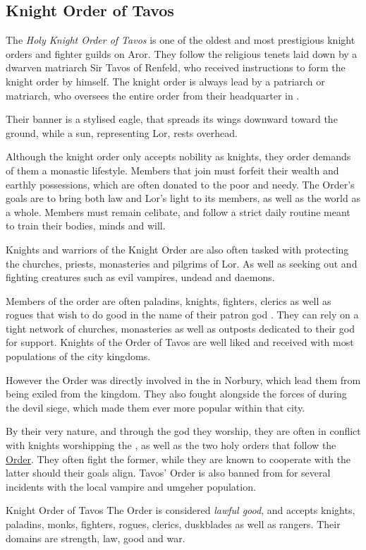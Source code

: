 \subsection{Knight Order of Tavos}
\label{sec:Knight Order of Tavos}

The \emph{Holy Knight Order of Tavos} is one of the oldest and most
prestigious knight orders and fighter guilds on Aror. They follow the
religious tenets laid down by a dwarven matriarch Sir Tavos of Renfeld, who
received instructions to form the knight order by  himself.
The knight order is always lead by a patriarch or matriarch, who oversees the
entire order from their headquarter in .

Their banner is a stylised eagle, that spreads its wings downward toward the
ground, while a sun, representing Lor, rests overhead.

Although the knight order only accepts nobility as knights, they order demands
of them a monastic lifestyle. Members that join must forfeit their wealth and
earthly possessions, which are often donated to the poor and needy. The
Order's goals are to bring both law and Lor's light to its members, as well as
the world as a whole. Members must remain celibate, and follow a strict daily
routine meant to train their bodies, minds and will.

Knights and warriors of the Knight Order are also often tasked with protecting
the churches, priests, monasteries and pilgrims of Lor. As well as seeking out
and fighting creatures such as evil vampires, undead and daemons.

Members of the order are often paladins, knights, fighters, clerics as well as
rogues that wish to do good in the name of their patron god .
They can rely on a tight network of churches, monasteries as well as outposts
dedicated to their god for support. Knights of the Order of Tavos are well liked
and received with most populations of the city kingdoms.

However the Order was directly involved in the 
in Norbury, which lead them from being exiled from the kingdom. They also fought
alongside the forces of  during the devil siege, which made
them ever more popular within that city.

By their very nature, and through the god they worship, they are often in
conflict with knights worshipping the , as well as
the two holy orders that follow the \hyperref[sec:Order]{Order}. They often
fight the former, while they are known to cooperate with the latter should
their goals align. Tavos' Order is also banned from 
for several incidents with the local vampire and umgeher population.

\begin{35e}{Knight Order of Tavos}
  The Order is considered \emph{lawful good}, and accepts knights, paladins,
  monks, fighters, rogues, clerics, duskblades as well as rangers. Their domains
  are strength, law, good and war.
\end{35e}
